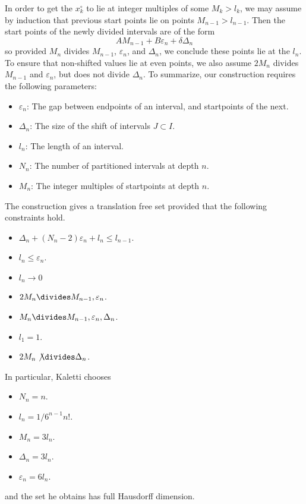 \documentclass{article}
\theoremstyle{plain}
\theoremstyle{plain}
\begin{document}
In order to get the $x_k^\circ$ to lie at integer multiples of some $M_k > l_k$, we may assume by induction that previous start points lie on points $M_{n-1} > l_{n-1}$. Then the start points of the newly divided intervals are of the form
%
\[ AM_{n-1} + B\varepsilon_n + \delta \Delta_n \]
%
so provided $M_n$ divides $M_{n-1}$, $\varepsilon_n$, and $\Delta_n$, we conclude these points lie at the $l_n$. To ensure that non-shifted values lie at even points, we also assume $2M_n$ divides $M_{n-1}$ and $\varepsilon_n$, but does not divide $\Delta_n$. To summarize, our construction requires the following parameters:
%
\begin{itemize}
    \item $\varepsilon_n$: The gap between endpoints of an interval, and startpoints of the next.
    \item $\Delta_n$: The size of the shift of intervals $J \subset I$.
    \item $l_n$: The length of an interval.
    \item $N_n$: The number of partitioned intervals at depth $n$.
    \item $M_n$: The integer multiples of startpoints at depth $n$.
\end{itemize}
%
The construction gives a translation free set provided that the following constraints hold.
%
\begin{itemize}
    \item $\Delta_n + (N_n - 2) \varepsilon_n + l_n \leq l_{n-1}$.
    \item $l_n \leq \varepsilon_n$.
    \item $l_n \to 0$
    \item $2M_n \divides M_{n-1}, \varepsilon_n$.
    \item $M_n \divides M_{n-1}, \varepsilon_n, \Delta_n$.
    \item $l_1 = 1$.
    \item $2M_n \not \divides \Delta_n$.
\end{itemize}
%
In particular, Kaletti chooses
%
\begin{itemize}
    \item $N_n = n$.
    \item $l_n = 1/6^{n-1} n!$.
    \item $M_n = 3l_n$.
    \item $\Delta_n = 3l_n$.
    \item $\varepsilon_n = 6l_n$.
\end{itemize}
%
and the set he obtains has full Hausdorff dimension.
\end{document}
